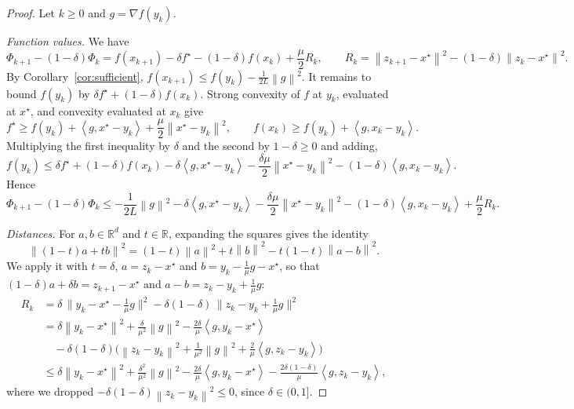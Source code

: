 \documentclass[11pt,a4paper]{article}
\theoremstyle{definition}
\theoremstyle{remark}
\newcommand{\R}{\mathbb{R}}
\newcommand{\norm}[1]{\left\lVert #1 \right\rVert}
\newcommand{\ip}[2]{\left\langle #1, #2 \right\rangle}
\begin{document}
\begin{proof}
Let $k \ge 0$ and $g = \nabla f(y_k)$.

\emph{Function values.} We have
\[
\Phi_{k+1} - (1-\delta)\Phi_k = f(x_{k+1}) - \delta f^\star - (1-\delta) f(x_k) + \frac\mu2 R_k,
\qquad R_k = \norm{z_{k+1} - x^\star}^2 - (1-\delta)\norm{z_k - x^\star}^2 .
\]
By Corollary~\ref{cor:sufficient}, $f(x_{k+1}) \le f(y_k) - \frac{1}{2L}\norm{g}^2$. It remains to bound $f(y_k)$ by $\delta f^\star + (1-\delta) f(x_k)$. Strong convexity of $f$ at $y_k$, evaluated at $x^\star$, and convexity evaluated at $x_k$ give
\[
f^\star \ge f(y_k) + \ip{g}{x^\star - y_k} + \frac\mu2\norm{x^\star - y_k}^2,
\qquad
f(x_k) \ge f(y_k) + \ip{g}{x_k - y_k}.
\]
Multiplying the first inequality by $\delta$ and the second by $1-\delta \ge 0$ and adding,
\[
f(y_k) \le \delta f^\star + (1-\delta) f(x_k) - \delta\ip{g}{x^\star - y_k} - \frac{\delta\mu}{2}\norm{x^\star - y_k}^2 - (1-\delta)\ip{g}{x_k - y_k}.
\]
Hence
\[
\Phi_{k+1} - (1-\delta)\Phi_k \le -\frac{1}{2L}\norm{g}^2 - \delta\ip{g}{x^\star - y_k} - \frac{\delta\mu}{2}\norm{x^\star - y_k}^2 - (1-\delta)\ip{g}{x_k - y_k} + \frac\mu2 R_k .
\]

\emph{Distances.} For $a, b \in \R^d$ and $t \in \R$, expanding the squares gives the identity
\[
\norm{(1-t)a + tb}^2 = (1-t)\norm{a}^2 + t\norm{b}^2 - t(1-t)\norm{a - b}^2 .
\]
We apply it with $t = \delta$, $a = z_k - x^\star$ and $b = y_k - \frac1\mu g - x^\star$, so that $(1-\delta)a + \delta b = z_{k+1} - x^\star$ and $a - b = z_k - y_k + \frac1\mu g$:
\begin{align*}
R_k &= \delta\,\Big\|y_k - x^\star - \frac1\mu g\Big\|^2 - \delta(1-\delta)\,\Big\|z_k - y_k + \frac1\mu g\Big\|^2 \\
&= \delta\norm{y_k - x^\star}^2 + \frac{\delta}{\mu^2}\norm{g}^2 - \frac{2\delta}{\mu}\ip{g}{y_k - x^\star} \\
&\quad - \delta(1-\delta)\Big(\norm{z_k - y_k}^2 + \frac{1}{\mu^2}\norm{g}^2 + \frac2\mu\ip{g}{z_k - y_k}\Big) \\
&\le \delta\norm{y_k - x^\star}^2 + \frac{\delta^2}{\mu^2}\norm{g}^2 - \frac{2\delta}{\mu}\ip{g}{y_k - x^\star} - \frac{2\delta(1-\delta)}{\mu}\ip{g}{z_k - y_k},
\end{align*}
where we dropped $-\delta(1-\delta)\norm{z_k - y_k}^2 \le 0$, since $\delta \in (0,1]$.


\end{proof}
\end{document}
